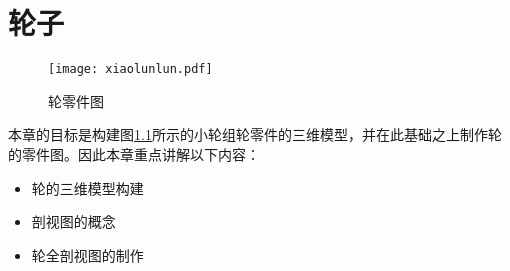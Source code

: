 \chapter{轮子}
\begin{figure}[htbp]
\centering
\texttt{[image: xiaolunlun.pdf]}
\caption{轮零件图}\label{fig:xiaolunlun.pdf}
\end{figure}

本章的目标是构建图\ref{fig:xiaolunlun.pdf}所示的小轮组轮零件的三维模型，并在此基础之上制作轮的零件图。因此本章重点讲解以下内容：
\begin{itemize}
\item 轮的三维模型构建
\item 剖视图的概念
\item 轮全剖视图的制作
\end{itemize}




%
\endinput